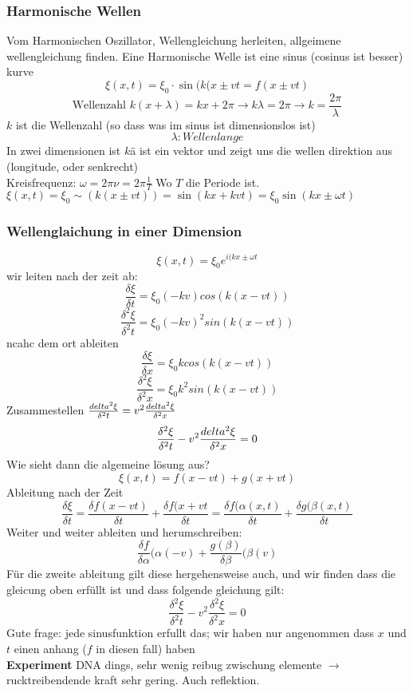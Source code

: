 \documentclass{article}
\newcommand{\experiment}{\\[2ex]\textbf{Experiment }}
\begin{document}
\subsubsection{Harmonische Wellen} Vom Harmonischen Oszillator, Wellengleichung herleiten, allgeimene wellengleichung finden. Eine Harmonische Welle ist eine sinus (cosinus ist besser) kurve
\[\xi(x,t)=\xi_0\cdot\sin(k(x\pm vt=f(x\pm vt)\]
\[\text{Wellenzahl }k(x+\lambda)=kx+2\pi \rightarrow k\lambda = 2\pi \rightarrow k=\frac{2\pi}{\lambda}\]
$k$ ist die Wellenzahl (so dass was im sinus ist dimensionslos ist)  \[\lambda:{Wellenlange}\]
In zwei dimensionen ist $k$ä ist ein vektor und zeigt uns die wellen direktion aus (longitude, oder senkrecht)
\\Kreisfrequenz: $\omega=2\pi\nu=2\pi\frac{1}{T}$ Wo $T$ die Periode ist.\\$\xi(x,t)=\xi_0\sim(k(x\pm vt))=\sin(kx+kvt)=\xi_0\sin(kx\pm\omega t)$

\subsubsection{Wellenglaichung in einer Dimension}
\[\xi(x,t)=\xi_0e^{i(kx\pm \omega t}\]
wir leiten nach der zeit ab:
\[\frac{\delta\xi}{\delta t}=\xi_0(-kv)cos(k(x-vt))\]
\[\frac{\delta^2\xi}{\delta^2t}=\xi_0(-kv)^2sin(k(x-vt))\]
ncahc dem ort ableiten
\[\frac{\delta\xi}{\delta x}=\xi_0kcos(k(x-vt))\]
\[\frac{\delta^2\xi}{\delta^2x}=\xi_0k^2sin(k(x-vt))\]
Zusammestellen $\frac{\\delta^2\xi}{\delta^2t}=v^2\frac{\\delta^2\xi}{\delta^2x}$
\[\frac{\delta^2\xi}{\delta^2t}-v^2\frac{\\delta^2\xi}{\delta^2x}=0\]
Wie sieht dann die algemeine lösung aus?
\[\xi(x,t)=f(x-vt)+g(x+vt)\]
Ableitung nach der Zeit
\[\frac{\delta\xi}{\delta t}=\frac{\delta f(x-vt)}{\delta t}+\frac{\delta f(x+vt}{\delta t}=\frac{\delta f(\alpha(x,t)}{\delta t}+\frac{\delta g(\beta(x,t)}{\delta t}\]
Weiter und weiter ableiten und herumschreiben:
\[\frac{\delta f}{\delta \alpha}(\alpha(-v)+\frac{g(\beta)}{\delta \beta}(\beta(v)\]
Für die zweite ableitung gilt diese hergehensweise auch, und wir finden dass die gleicung oben erfüllt ist und dass folgende gleichung gilt:
\[\frac{\delta^2\xi}{\delta^2t}-v^2\frac{\delta^2\xi}{\delta^2x}=0\]
Gute frage: jede sinusfunktion erfullt das; wir haben nur angenommen dass $x$ und $t$ einen anhang ($f$ in diesen fall) haben
\experiment DNA dings, sehr wenig reibug zwischung elemente $\rightarrow$ rucktreibendende kraft sehr gering. Auch reflektion. 
\end{document}
